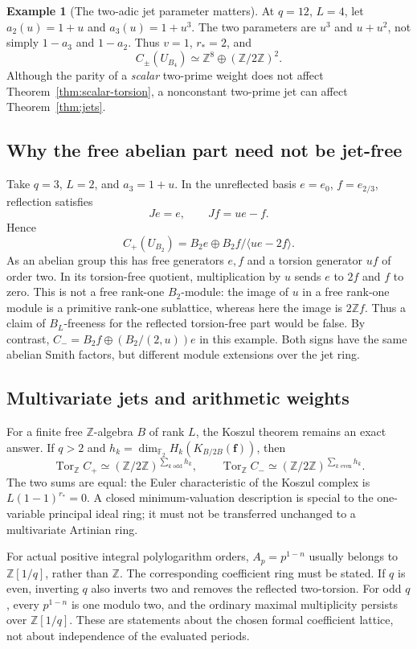 \documentclass[11pt]{article}
\numberwithin{equation}{section}
\theoremstyle{definition}
\newtheorem{example}[theorem]{Example}
\theoremstyle{remark}
\DeclareMathOperator{\Tor}{Tor}
\newcommand{\Z}{\mathbb Z}
\newcommand{\F}{\mathbb{F}_2}
\begin{document}
\begin{example}[The two-adic jet parameter matters]
At $q=12$, $L=4$, let $a_2(u)=1+u$ and $a_3(u)=1+u^3$.
The two parameters are $u^3$ and $u+u^2$, not simply
$1-a_3$ and $1-a_2$. Thus $v=1$, $r_*=2$, and
\[
 C_\pm(U_{B_4})\simeq\Z^8\oplus(\Z/2\Z)^2.
\]
Although the parity of a \emph{scalar} two-prime weight does not affect
Theorem~\ref{thm:scalar-torsion}, a nonconstant two-prime jet can affect
Theorem~\ref{thm:jets}.
\end{example}

\subsection{Why the free abelian part need not be jet-free}
Take $q=3$, $L=2$, and $a_3=1+u$. In the unreflected basis
$e=e_0$, $f=e_{2/3}$, reflection satisfies
\[
 Je=e,\qquad Jf=ue-f.
\]
Hence
\begin{equation}
 C_+(U_{B_2})=B_2e\oplus B_2f\big/\langle ue-2f\rangle.
 \label{eq:nonflat}
\end{equation}
As an abelian group this has free generators $e,f$ and a torsion generator
$uf$ of order two. In its torsion-free quotient, multiplication by $u$
sends $e$ to $2f$ and $f$ to zero. This is not a free rank-one
$B_2$-module: the image of $u$ in a free rank-one module is a primitive
rank-one sublattice, whereas here the image is $2\Z f$.
Thus a claim of $B_L$-freeness for the reflected torsion-free part would
be false. By contrast, $C_-=B_2f\oplus(B_2/(2,u))e$ in this example.
Both signs have the same abelian Smith factors, but different module
extensions over the jet ring.

\subsection{Multivariate jets and arithmetic weights}
For a finite free $\Z$-algebra $B$ of rank $L$, the Koszul theorem remains
an exact answer. If $q>2$ and
$h_k=\dim_{\F} H_k(K_{B/2B}(\boldsymbol f))$, then
\[
 \Tor_\Z C_+\simeq(\Z/2\Z)^{\sum_{k\text{ odd}}h_k},\qquad
 \Tor_\Z C_-\simeq(\Z/2\Z)^{\sum_{k\text{ even}}h_k}.
\]
The two sums are equal: the Euler characteristic of the Koszul complex
is $L(1-1)^{r_*}=0$. A closed minimum-valuation description is special
to the one-variable principal ideal ring; it must not be transferred
unchanged to a multivariate Artinian ring.

For actual positive integral polylogarithm orders, $A_p=p^{1-n}$ usually
belongs to $\Z[1/q]$, rather than $\Z$. The corresponding coefficient
ring must be stated. If $q$ is even, inverting $q$ also inverts two and
removes the reflected two-torsion. For odd $q$, every $p^{1-n}$ is one
modulo two, and the ordinary maximal multiplicity persists over
$\Z[1/q]$. These are statements about the chosen formal coefficient
lattice, not about independence of the evaluated periods.
\end{document}
